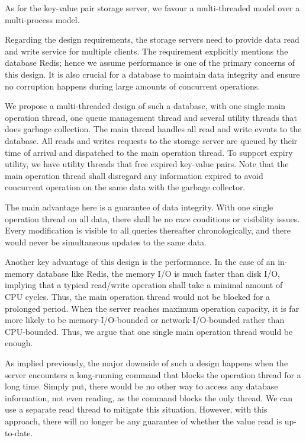 \documentclass[12pt]{article}
\begin{document}
As for the key-value pair storage server, we favour a multi-threaded model over a multi-process model.

Regarding the design requirements, the storage servers need to provide data read and write service for multiple clients. The requirement explicitly mentions the database Redis; hence we assume performance is one of the primary concerns of this design. It is also crucial for a database to maintain data integrity and ensure no corruption happens during large amounts of concurrent operations.

We propose a multi-threaded design of such a database, with one single main operation thread, one queue management thread and several utility threads that does garbage collection. The main thread handles all read and write events to the database. All reads and writes requests to the storage server are queued by their time of arrival and dispatched to the main operation thread. To support expiry utility, we have utility threads that free expired key-value pairs. Note that the main operation thread shall disregard any information expired to avoid concurrent operation on the same data with the garbage collector.

The main advantage here is a guarantee of data integrity. With one single operation thread on all data, there shall be no race conditions or visibility issues. Every modification is visible to all queries thereafter chronologically, and there would never be simultaneous updates to the same data. 

Another key advantage of this design is the performance. In the case of an in-memory database like Redis, the memory I/O is much faster than disk I/O, implying that a typical read/write operation shall take a minimal amount of CPU cycles. Thus, the main operation thread would not be blocked for a prolonged period. When the server reaches maximum operation capacity, it is far more likely to be memory-I/O-bounded or network-I/O-bounded rather than CPU-bounded. Thus, we argue that one single main operation thread would be enough.

As implied previously, the major downside of such a design happens when the server encounters a long-running command that blocks the operation thread for a long time. Simply put, there would be no other way to access any database information, not even reading, as the command blocks the only thread. We can use a separate read thread to mitigate this situation. However, with this approach, there will no longer be any guarantee of whether the value read is up-to-date.
\end{document}
